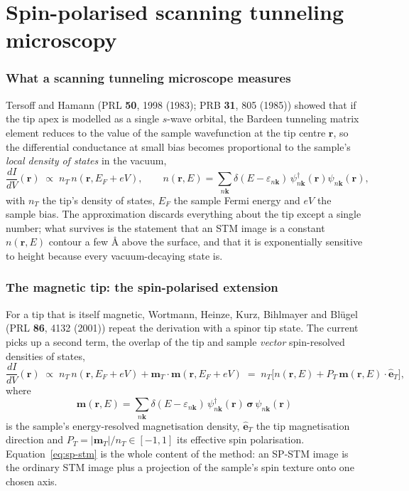 \documentclass[11pt]{article}
\begin{document}
\part{Spin-polarised scanning tunneling microscopy}
\label{part:spinstm}

\section{What a scanning tunneling microscope measures}

Tersoff and Hamann (PRL \textbf{50}, 1998 (1983); PRB \textbf{31}, 805 (1985))
showed that if the tip apex is modelled as a single $s$-wave orbital, the
Bardeen tunneling matrix element reduces to the value of the sample
wavefunction at the tip centre $\mathbf r$, so the differential conductance at
small bias becomes proportional to the sample's \emph{local density of states}
in the vacuum,
\begin{equation}
  \frac{dI}{dV}(\mathbf r)\;\propto\;n_T\,n(\mathbf r,E_F+eV),
  \qquad
  n(\mathbf r,E)=\sum_{n\mathbf k}\delta(E-\varepsilon_{n\mathbf k})\,
    \psi^\dagger_{n\mathbf k}(\mathbf r)\psi_{n\mathbf k}(\mathbf r),
  \label{eq:tersoff-hamann}
\end{equation}
with $n_T$ the tip's density of states, $E_F$ the sample Fermi energy and $eV$
the sample bias. The approximation discards everything about the tip except a
single number; what survives is the statement that an STM image is a constant
$n(\mathbf r,E)$ contour a few {\AA} above the surface, and that it is
exponentially sensitive to height because every vacuum-decaying state is.

\section{The magnetic tip: the spin-polarised extension}

For a tip that is itself magnetic, Wortmann, Heinze, Kurz, Bihlmayer and
Bl\"ugel (PRL \textbf{86}, 4132 (2001)) repeat the derivation with a spinor
tip state. The current picks up a second term, the overlap of the tip and
sample \emph{vector} spin-resolved densities of states,
\begin{equation}
  \frac{dI}{dV}(\mathbf r)\;\propto\;
    n_T\,n(\mathbf r,E_F+eV)+\mathbf m_T\cdot\mathbf m(\mathbf r,E_F+eV)
  \;=\;n_T\Big[n(\mathbf r,E)+P_T\,\mathbf m(\mathbf r,E)\cdot\hat{\mathbf e}_T\Big],
  \label{eq:sp-stm}
\end{equation}
where
\begin{equation}
  \mathbf m(\mathbf r,E)=\sum_{n\mathbf k}\delta(E-\varepsilon_{n\mathbf k})\,
    \psi^\dagger_{n\mathbf k}(\mathbf r)\,\boldsymbol\sigma\,\psi_{n\mathbf k}(\mathbf r)
  \label{eq:vector-ldos}
\end{equation}
is the sample's energy-resolved magnetisation density, $\hat{\mathbf e}_T$ the
tip magnetisation direction and $P_T=|\mathbf m_T|/n_T\in[-1,1]$ its effective
spin polarisation. Equation~\eqref{eq:sp-stm} is the whole content of the
method: an SP-STM image is the ordinary STM image plus a projection of the
sample's spin texture onto one chosen axis.
\end{document}
